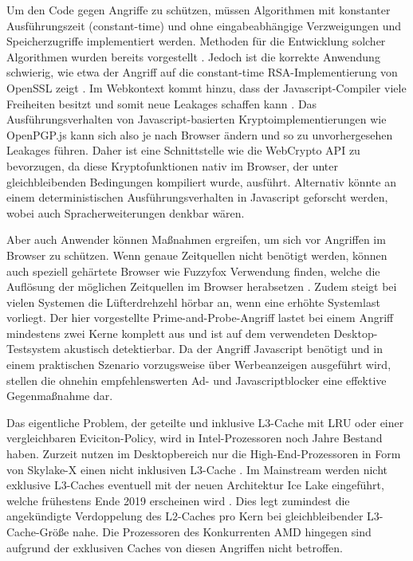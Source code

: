Um den Code gegen Angriffe zu schützen, müssen Algorithmen mit konstanter Ausführungszeit (constant-time) und ohne eingabeabhängige Verzweigungen und Speicherzugriffe implementiert werden.
Methoden für die Entwicklung solcher Algorithmen wurden bereits vorgestellt \cite{ConstTimeAlgorithm}.
Jedoch ist die korrekte Anwendung schwierig, wie etwa der Angriff auf die constant-time RSA-Implementierung von OpenSSL zeigt \cite{CacheBleed}.
Im Webkontext kommt hinzu, dass der Javascript-Compiler viele Freiheiten besitzt und somit neue Leakages schaffen kann \cite{DriveByPaper}.
Das Ausführungsverhalten von Javascript-basierten Kryptoimplementierungen wie OpenPGP.js kann sich also je nach Browser ändern und so zu unvorhergesehen Leakages führen.
Daher ist eine Schnittstelle wie die WebCrypto API \cite{WebCryptoAPI} zu bevorzugen, da diese Kryptofunktionen nativ im Browser, der unter gleichbleibenden Bedingungen kompiliert wurde, ausführt.
Alternativ könnte an einem deterministischen Ausführungsverhalten in Javascript geforscht werden, wobei auch Spracherweiterungen denkbar wären.

Aber auch Anwender können Maßnahmen ergreifen, um sich vor Angriffen im Browser zu schützen.
Wenn genaue Zeitquellen nicht benötigt werden, können auch speziell gehärtete Browser wie Fuzzyfox \cite{Fuzzyfox} Verwendung finden, welche die Auflösung der möglichen Zeitquellen im Browser herabsetzen \cite{FantasticTimers}.
Zudem steigt bei vielen Systemen die Lüfterdrehzehl hörbar an, wenn eine erhöhte Systemlast vorliegt. 
Der hier vorgestellte Prime-and-Probe-Angriff lastet bei einem Angriff mindestens zwei Kerne komplett aus und ist auf dem verwendeten Desktop-Testsystem akustisch detektierbar.
Da der Angriff Javascript benötigt und in einem praktischen Szenario vorzugsweise über Werbeanzeigen ausgeführt wird, stellen die ohnehin empfehlenswerten Ad- und Javascriptblocker eine effektive Gegenmaßnahme dar.

Das eigentliche Problem, der geteilte und inklusive L3-Cache mit LRU oder einer vergleichbaren Eviciton-Policy, wird in Intel-Prozessoren noch Jahre Bestand haben.
Zurzeit nutzen im Desktopbereich nur die High-End-Prozessoren in Form von Skylake-X einen nicht inklusiven L3-Cache \cite{SkylakeXL3Cache}.
Im Mainstream werden nicht exklusive L3-Caches eventuell mit der neuen Architektur Ice Lake eingeführt, welche frühestens Ende 2019 erscheinen wird \cite{IceLakeReleaseDate}.
Dies legt zumindest die angekündigte Verdoppelung des L2-Caches pro Kern bei gleichbleibender L3-Cache-Größe nahe.
Die Prozessoren des Konkurrenten AMD hingegen sind aufgrund der exklusiven Caches \cite{CacheRyzen} von diesen Angriffen nicht betroffen.

